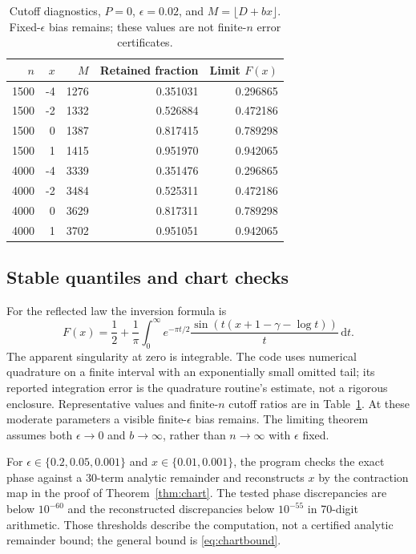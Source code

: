 \documentclass[11pt,a4paper]{article}
\numberwithin{equation}{section}
\theoremstyle{definition}
\theoremstyle{remark}
\newcommand{\ee}{\epsilon}
\newcommand{\dd}{\,\mathrm d}
\begin{document}
\begin{table}[htbp]
\centering
\caption{Cutoff diagnostics, $P=0$, $\epsilon=0.02$, and $M=\lfloor D+bx\rfloor$. Fixed-$\epsilon$ bias remains; these values are not finite-$n$ error certificates.}
\label{tab:cutoff}
\begin{tabular}{rrrrr}
\toprule $n$ & $x$ & $M$ & Retained fraction & Limit $F(x)$ \\
\midrule
1500 & -4 & 1276 & 0.351031 & 0.296865 \\
1500 & -2 & 1332 & 0.526884 & 0.472186 \\
1500 & 0 & 1387 & 0.817415 & 0.789298 \\
1500 & 1 & 1415 & 0.951970 & 0.942065 \\
4000 & -4 & 3339 & 0.351476 & 0.296865 \\
4000 & -2 & 3484 & 0.525311 & 0.472186 \\
4000 & 0 & 3629 & 0.817311 & 0.789298 \\
4000 & 1 & 3702 & 0.951051 & 0.942065 \\
\bottomrule
\end{tabular}
\end{table}

\subsection{Stable quantiles and chart checks}
For the reflected law the inversion formula is
\begin{equation}\label{eq:cdfintegral}
 F(x)=\frac12+\frac1\pi\int_0^\infty
 e^{-\pi t/2}\frac{\sin(t(x+1-\gamma-\log t))}{t}\dd t.
\end{equation}
The apparent singularity at zero is integrable. The code uses numerical
quadrature on a finite interval with an exponentially small omitted tail;
its reported integration error is the quadrature routine's estimate, not
a rigorous enclosure. Representative values and finite-$n$ cutoff ratios
are in Table~\ref{tab:cutoff}. At these moderate parameters a visible
finite-$\ee$ bias remains. The limiting theorem assumes both
$\ee\to0$ and $b\to\infty$, rather than $n\to\infty$ with $\ee$ fixed.

For $\ee\in\{0.2,0.05,0.001\}$ and
$x\in\{0.01,0.001\}$, the program checks the exact phase against a
30-term analytic remainder and reconstructs $x$ by the contraction map
in the proof of Theorem~\ref{thm:chart}. The tested phase discrepancies
are below $10^{-60}$ and the reconstructed discrepancies below $10^{-55}$
in 70-digit arithmetic. Those thresholds describe the computation, not a
certified analytic remainder bound; the general bound is
\eqref{eq:chartbound}.
\end{document}

